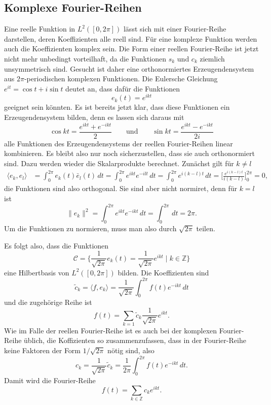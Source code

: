 \subsection{Komplexe Fourier-Reihen}
\label{subsection:complex-fourier-series}
Eine reelle Funktion in $L^2([0,2\pi])$ lässt sich mit einer Fourier-Reihe
darstellen, deren Koeffizienten alle reell sind.
Für eine komplexe Funktion werden auch die Koeffizienten komplex sein.
Die Form einer reellen Fourier-Reihe ist jetzt nicht mehr unbedingt
vorteilhaft, da die Funktionen $s_k$ und $c_k$ ziemlich unsymmetrisch
sind.
Gesucht ist daher eine orthonormiertes Erzeugendensystem aus
$2\pi$-periodischen komplexen Funktionen.
Die Eulersche Gleichung $e^{it} = \cos t + i\sin t$ deutet an, dass
dafür die Funktionen
\[
e_k(t) = e^{ikt}
\]
geeignet sein könnten.
Es ist bereits jetzt klar, dass diese Funktionen ein Erzeugendensystem
bilden, denn es lassen sich daraus mit
\[
\cos kt = \frac{e^{ikt}+e^{-ikt}}2
\qquad\text{und}\qquad
\sin kt = \frac{e^{ikt}-e^{-ikt}}{2i}
\]
alle Funktionen des Erzeugendensystems
der reellen Fourier-Reihen linear kombinieren.
Es bleibt also nur noch sicherzustellen, dass sie auch orthonormiert
sind.
Dazu werden wieder die Skalarprodukte berechnet.
Zunächst gilt für $k\ne l$
\begin{align*}
\langle e_k,e_l\rangle
&=
\int_0^{2\pi} e_k(t) \bar{e}_l(t) \,dt
=
\int_0^{2\pi} e^{ikt}e^{-ilt}\,dt
=
\int_0^{2\pi} e^{i(k-l)t}\,dt
=
\biggl[ \frac{e^{i(k-l)t}}{i(k-l)} \biggr]_0^{2\pi} 
=
0,
\end{align*}
die Funktionen sind also orthogonal.
Sie sind aber nicht normiret, denn für $k=l$ ist 
\[
\|e_k\|^2
=
\int_0^{2\pi} e^{ikt}e^{-ikt}\,dt
=
\int_0^{2\pi} \,dt = 2\pi.
\]
Um die Funktionen zu normieren, muss man also durch $\sqrt{2\pi}$ teilen.

Es folgt also, dass die Funktionen
\[
\mathcal{C}
=
\biggl\{
\frac1{\sqrt{2\pi}} e_k(t)
=
\frac1{\sqrt{2\pi}} e^{ikt}\;\bigg|\; k\in\mathbb Z
\biggr\}
\]
eine Hilbertbasis von $L^2([0,2\pi])$ bilden.
Die Koeffizienten sind 
\[
\tilde{c}_k 
=
\langle f, e_k\rangle
=
\frac1{\sqrt{2\pi}}
\int_0^{2\pi} f(t) e^{-ikt}\,dt
\]
und die zugehörige Reihe ist
\[
f(t)
=
\sum_{k=1} \tilde{c}_k \frac{1}{\sqrt{2\pi}} e^{ikt}.
\]
Wie im Falle der reellen Fourier-Reihe ist es auch bei der komplexen
Fourier-Reihe üblich, die Koffizienten so zusammenzufassen, dass in der
Fourier-Reihe keine Faktoren der Form $1/\sqrt{2\pi}$ nötig sind, also
\[
c_k
=
\frac1{\sqrt{2\pi}} \tilde{c}_k
=
\frac1{2\pi} \int_0^{2\pi} f(t) e^{-ikt}\,dt.
\]
Damit wird die Fourier-Reihe 
\[
f(t) = \sum_{k\in\mathbb Z} c_k e^{ikt}.
\]

